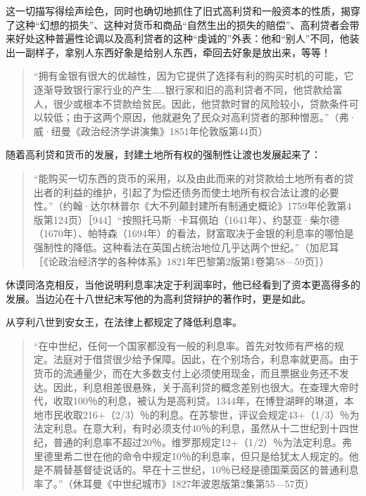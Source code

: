 这一切描写得绘声绘色，同时也确切地抓住了旧式高利贷和一般资本的性质，揭穿了这种“幻想的损失”、这种对货币和商品“自然生出的损失的赔偿”、高利贷者会带来好处这种普遍性论调以及高利贷者的这种“虔诚的”外表：他和“别人”不同，他装出一副样子，拿别人东西好象是给别人东西，牵回去好象是放出来，等等！


\begin{quote}{“拥有金银有很大的优越性，因为它提供了选择有利的购买时机的可能，它逐渐导致银行家行业的产生……银行家和旧的高利贷者不同，他贷款给富人，很少或根本不贷款给贫民。因此，他贷款时冒的风险较小，贷款条件可以较低；由于这两个原因，他就避免了民众对高利贷者的那种憎恶。”（弗·威·纽曼《政治经济学讲演集》1851年伦敦版第44页）}\end{quote}

随着高利贷和货币的发展，封建土地所有权的强制性让渡也发展起来了：

\begin{quote}{“能购买一切东西的货币的采用，以及由此而来的对贷款给土地所有者的贷出者的利益的维护，引起了为偿还债务而使土地所有权合法让渡的必要性。”（约翰·达尔林普尔《大不列颠封建所有制通史概论》1759年伦敦第4版第124页）［944］“按照托马斯·卡耳佩珀（1641年）、约瑟亚·柴尔德（1670年）、帕特森（1694年）的看法，财富取决于金银的利息率的哪怕是强制性的降低。这种看法在英国占统治地位几乎达两个世纪。”（加尼耳［《论政治经济学的各种体系》1821年巴黎第2版第1卷第58—59页］）}\end{quote}

休谟同洛克相反，当他说明利息率决定于利润率时，他已经看到了资本更高得多的发展。当边沁在十八世纪末写他的为高利贷辩护的著作时，更是如此。

从亨利八世到安女王，在法律上都规定了降低利息率。

\begin{quote}{“在中世纪，任何一个国家都没有一般的利息率。首先对牧师有严格的规定。法庭对于借贷很少给予保障。因此，在个别场合，利息率就更高。由于货币的流通量少，而在大多数支付上必须使用现金，而且票据业务还不发达。因此，利息相差很悬殊，关于高利贷的概念差别也很大。在查理大帝时代，收取100％的利息，被认为是高利贷。1344年，在博登湖畔的琳道，本地市民收取216+（2/3）％的利息。在苏黎世，评议会规定43+（1/3）％为法定利息。在意大利，有时必须支付40％的利息，虽然从十二世纪到十四世纪，普通的利息率不超过20％。维罗那规定12+（1/2）％为法定利息。弗里德里希二世在他的命令中规定10％的利息率，但只是给犹太人规定的。他是不屑替基督徒说话的。早在十三世纪，10％已经是德国莱茵区的普通利息率了。”（休耳曼《中世纪城市》1827年波恩版第2集第55—57页）}\end{quote}

